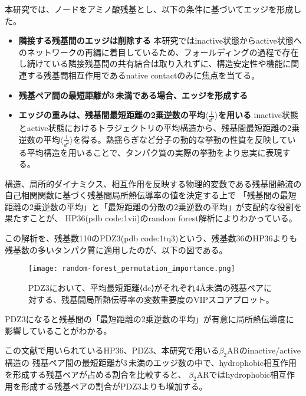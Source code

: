 本研究では、ノードをアミノ酸残基とし、以下の条件に基づいてエッジを形成した。
\begin{itemize}
    \item \textbf{隣接する残基間のエッジは削除する}  
    本研究ではinactive状態からactive状態へのネットワークの再編に着目しているため、フォールディングの過程で存在し続けている隣接残基間の共有結合は取り入れずに、構造安定性や機能に関連する残基間相互作用であるnative contactのみに焦点を当てる。
    \item \textbf{残基ペア間の最短距離が3\,\text{\AA}未満である場合、エッジを形成する}  
    \item \textbf{エッジの重みは、残基間最短距離の2乗逆数の平均$\langle \frac{1}{d^2} \rangle$を用いる}  
    inactive状態とactive状態におけるトラジェクトリの平均構造から、残基間最短距離の2乗逆数の平均$\langle \frac{1}{d^2} \rangle$を得る。熱揺らぎなど分子の動的な挙動の性質を反映している平均構造を用いることで、タンパク質の実際の挙動をより忠実に表現する。    
  \end{itemize}

構造、局所的ダイナミクス、相互作用を反映する物理的変数である残基間熱流の自己相関関数に基づく残基間局所熱伝導率の値を決定する上で
「残基間の最短距離の2乗逆数の平均」と「最短距離の分散の2乗逆数の平均」が支配的な役割を果たすことが、
HP36(pdb code:1vii)のrandom forest解析によりわかっている\cite{Wang2024}。

この解析を、残基数110のPDZ3(pdb code:1tq3)という、残基数36のHP36よりも残基数の多いタンパク質に適用したのが、以下の図である。

\begin{figure}[htbp]
    \centering
    \texttt{[image: random-forest\_permutation\_importance.png]}
    \caption{PDZ3において、平均最短距離⟨dc⟩がそれぞれ4Å未満の残基ペアに対する、残基間局所熱伝導率の変数重要度のVIPスコアプロット。}
    \label{fig:random_forest}
\end{figure}

\newpage

PDZ3になると残基間の「最短距離の2乗逆数の平均」が有意に局所熱伝導度に影響していることがわかる。

この文献で用いられているHP36、PDZ3、本研究で用いる$\beta_2$ARのinactive/active構造の
残基ペア間の最短距離が3\,\text{\AA}未満のエッジ数の中で、hydrophobic相互作用を形成する残基ペアが占める割合を比較すると、
$\beta_2$ARではhydrophobic相互作用を形成する残基ペアの割合がPDZ3よりも増加する。

